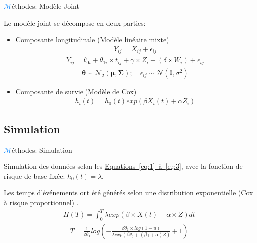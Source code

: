 \begin{frame}{{\huge\textcolor{dodgerblue}{$\mathcal{M}$}}éthodes: Modèle Joint}
\par{Le modèle joint se décompose en deux parties:
\begin{itemize}
    \item Composante longitudinale (Modèle linéaire mixte)
        \textcolor{springgreen3}{
            \begin{eqnarray}Y_{ij}=X_{ij}+\epsilon_{ij}\label{eq:1}\end{eqnarray}
            \begin{eqnarray}Y_{ij}=\theta_{0i}+\theta_{1i}\times t_{ij} + \gamma \times Z_i + (\delta \times W_i) + \epsilon_{ij}\label{eq:2}\end{eqnarray}
            \begin{eqnarray}\boldsymbol\theta \sim \mathcal{N}_2(\boldsymbol\mu, \boldsymbol\Sigma)\nonumber\label{Eq3};\quad \epsilon_{ij} \sim \mathcal{N}(0, \sigma^2)\nonumber\label{Eq4}\end{eqnarray}
        }
    \item Composante de survie (Modèle de Cox)
        \textcolor{springgreen3}{\begin{eqnarray}h_i(t)=h_0(t) exp(\beta X_i(t)+\alpha Z_i)\label{eq:3}\end{eqnarray}}
\end{itemize}
}
\end{frame}


\subsection{Simulation}
\begin{frame}{{\huge\textcolor{dodgerblue}{$\mathcal{M}$}}éthodes: Simulation}%
\par{Simulation des données selon les \hyperref[eq:1]{Equations~\ref*{eq:1}~à~\ref{eq:3}}, avec la fonction de risque de base fixée: \textcolor{springgreen3}{$h_0(t)=\lambda$}.}
\par{Les temps d'événements ont été générés selon une distribution exponentielle (Cox à risque proportionnel) \textcolor{dodgerblue}{\citep{austin_generating_2012}}.
\textcolor{springgreen3}{\begin{eqnarray}H(T)=\int_0^T \lambda exp(\beta \times X(t) + \alpha \times Z) dt\end{eqnarray}}
\textcolor{springgreen3}{\begin{eqnarray}T=\frac{1}{\beta\theta_1} log\left( - \frac{\beta\theta_1 \times log(1-u)}{\lambda exp(\beta\theta_0+(\beta\gamma+\alpha)Z)}+1 \right)\end{eqnarray}}
}
\end{frame}

